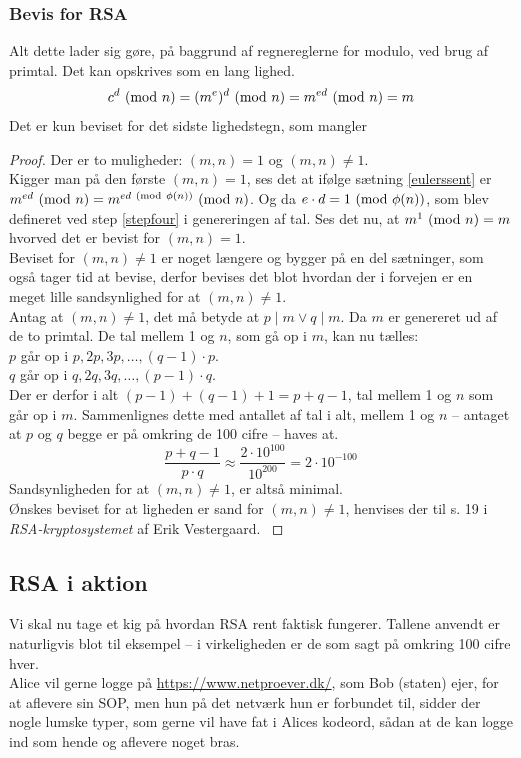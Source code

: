 \subsubsection{Bevis for RSA}
Alt dette lader sig gøre, på baggrund af regnereglerne for modulo, ved brug af primtal.
Det kan opskrives som en lang lighed.
\[c^d \ (\mathrm{mod}\ n) = (m^e)^d \ (\mathrm{mod}\ n) = m^{ed} \ (\mathrm{mod}\ n) = m\]
Det er kun beviset for det sidste lighedstegn, som mangler
\begin{proof}
        Der er to muligheder: \((m, n) = 1\) og \((m, n) \neq 1\).\\
        Kigger man på den første \((m, n) = 1\), ses det at ifølge sætning \ref{eulerssent} er \(m^{ed} \ (\mathrm{mod}\ n) = m^{ed \ (\mathrm{mod}\ \phi(n))} \ (\mathrm{mod}\ n)\).
        Og da \(e \cdot d = 1 \ (\mathrm{mod}\ \phi(n))\), som blev defineret ved step \ref{stepfour} i genereringen af tal.
        Ses det nu, at \(m^1 \ (\mathrm{mod}\ n) = m\) hvorved det er bevist for \((m, n) = 1\).\\
        Beviset for \((m, n) \neq 1\) er noget længere og bygger på en del sætninger, som også tager tid at bevise, derfor bevises det blot hvordan der i forvejen er en meget lille sandsynlighed for at \((m, n) \neq 1\).\\
        Antag at \((m, n) \neq 1\), det må betyde at \(p \mid m \lor q \mid m\). Da \(m\) er genereret ud af de to primtal.
        De tal mellem 1 og \(n\), som gå op i \(m\), kan nu tælles:\\
        \(p\) går op i \(p, 2p, 3p, \hdots , (q - 1) \cdot p\).\\
        \(q\) går op i \(q, 2q, 3q, \hdots , (p - 1) \cdot q\).\\
        Der er derfor i alt \((p - 1) + (q - 1) + 1 = p + q - 1\), tal mellem 1 og \(n\) som går op i \(m\).
        Sammenlignes dette med antallet af tal i alt, mellem 1 og \(n\) -- antaget at \(p\) og \(q\) begge er på omkring de 100 cifre -- haves at.
        \[\frac{p + q - 1}{p \cdot q} \approx \frac{2 \cdot 10^{100}}{10^{200}} = 2 \cdot 10^{-100}\]
        Sandsynligheden for at \((m, n) \neq 1\), er altså minimal.\\
        Ønskes beviset for at ligheden er sand for \((m, n) \neq 1\), henvises der til s. 19 i \textit{RSA-kryptosystemet} af Erik Vestergaard. \cite[19]{vestergaard}
\end{proof}


\subsection{RSA i aktion}
Vi skal nu tage et kig på hvordan RSA rent faktisk fungerer.
Tallene anvendt er naturligvis blot til eksempel -- i virkeligheden er de som sagt på omkring 100 cifre hver.\\
Alice vil gerne logge på \url{https://www.netproever.dk/}, som Bob (staten) ejer, for at aflevere sin SOP, men hun på det netværk hun er forbundet til, sidder der nogle lumske typer, som gerne vil have fat i Alices kodeord, sådan at de kan logge ind som hende og aflevere noget bras.

